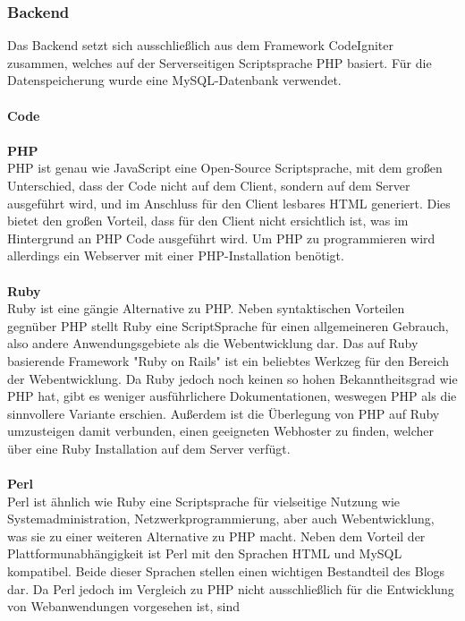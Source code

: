     \subsubsection{Backend}
    Das Backend setzt sich ausschließlich aus dem Framework CodeIgniter zusammen, welches auf der Serverseitigen Scriptsprache PHP basiert. Für die Datenspeicherung
    wurde eine MySQL-Datenbank verwendet.\\
    \\
    \textbf{Code}\\
    \\
    \textbf{PHP}\\
    {PHP\cite{php} ist genau wie JavaScript eine Open-Source Scriptsprache, mit dem großen Unterschied, dass der Code nicht auf dem Client, sondern auf dem Server ausgeführt wird,
    und im Anschluss für den Client lesbares HTML generiert. Dies bietet den großen Vorteil, dass für den Client nicht ersichtlich ist, was im Hintergrund an PHP Code ausgeführt
    wird. Um PHP zu programmieren wird allerdings ein Webserver mit einer PHP-Installation benötigt.\\
    \\
    \textbf{Ruby}\\
    {Ruby\cite{ruby}} ist eine gängie Alternative zu PHP. Neben syntaktischen Vorteilen gegnüber PHP stellt Ruby eine ScriptSprache für einen allgemeineren Gebrauch,
    also andere Anwendungsgebiete als die Webentwicklung dar. Das auf Ruby basierende Framework "Ruby on Rails" ist ein beliebtes Werkzeg für den Bereich der Webentwicklung.
    Da Ruby jedoch noch keinen so hohen Bekanntheitsgrad wie PHP hat, gibt es weniger ausführlichere Dokumentationen, weswegen PHP als die sinnvollere Variante erschien.
    Außerdem ist die Überlegung von PHP auf Ruby umzusteigen damit verbunden, einen geeigneten Webhoster zu finden, welcher über eine Ruby Installation auf dem Server verfügt.\\
    \\
    \textbf{Perl}\\
    {Perl\cite{perl}} ist ähnlich wie Ruby eine Scriptsprache für vielseitige Nutzung wie Systemadministration, Netzwerkprogrammierung, aber auch Webentwicklung, was sie
    zu einer weiteren Alternative zu PHP macht. Neben dem Vorteil der Plattformunabhängigkeit ist Perl mit den Sprachen HTML und MySQL kompatibel. Beide dieser Sprachen stellen
    einen wichtigen Bestandteil des Blogs dar. Da Perl jedoch im Vergleich zu PHP nicht ausschließlich für die Entwicklung von Webanwendungen vorgesehen ist, sind
}
